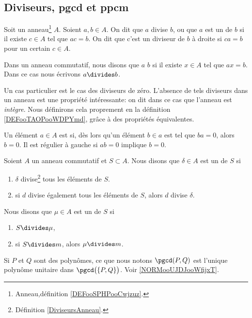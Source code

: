 \subsection{Diviseurs, pgcd et ppcm}
\label{SUBooDiviseursPGCDPPCM}

\begin{definition}\label{DiviseursAnneau}
	Soit un anneau\footnote{Anneau,définition \ref{DEFooSPHPooCwjzuz}.} \( A\). Soient \( a, b \in A \). On dit que \( a\) divise \( b\), ou que \( a\) est un  de \( b\) si il existe \( c \in A \) tel que \( ac = b \). On dit que c'est un diviseur de \( b\) à droite si \( ca = b \) pour un certain \( c \in A \).

	Dans un anneau commutatif, nous disons que \( a\)  \( b\) si il existe \( x\in A\) tel que \( ax=b\). Dans ce cas nous écrivons \( a\divides b\).
\end{definition}

\begin{normaltext}	\label{NORMooAnneauIntegreIntro}
	Un cas particulier est le cas des diviseurs de zéro. L'absence de tels diviseurs dans un anneau est une propriété intéressante: on dit dans ce cas que l'anneau est \emph{intègre}. Nous définirons cela proprement en la définition \ref{DEFooTAOPooWDPYmd}, grâce à des propriétés équivalentes.
\end{normaltext}

\begin{definition}\label{DEFooAnneauEltRegulier}
	Un élément \( a\in A\) est  si, dès lors qu'un élément \( b \in a \) est tel que \( ba=0\), alors \( b=0\). Il est régulier à gauche si \( ab=0\) implique \( b=0\).
\end{definition}

\begin{definition}          \label{DefrYwbct}
	Soient \( A\) un anneau commutatif et \( S\subset A\). Nous disons que \( \delta\in A\) est un  de \( S\) si
	\begin{enumerate}
		\item
		      \( \delta\) divise\footnote{Définition \ref{DiviseursAnneau}.} tous les éléments de \( S\).
		\item       \label{ITEMooVCKGooWDXZOj}
		      si \( d\) divise également tous les éléments de \( S\), alors \( d\) divise \( \delta\).
	\end{enumerate}
	Nous disons que \( \mu\in A\) est un  de \( S\) si
	\begin{enumerate}
		\item
		      \( S\divides \mu\),
		\item
		      si \( S\divides m\), alors \( \mu\divides m\).
	\end{enumerate}
	Si \( P\) et \( Q\) sont des polynômes, ce que nous notons \( \pgcd(P,Q)\) est l'unique polynôme unitaire dans \( \pgcd\big( \{ P,Q \} \big)\). Voir \ref{NORMooUJDJooWfijxT}.
\end{definition}

